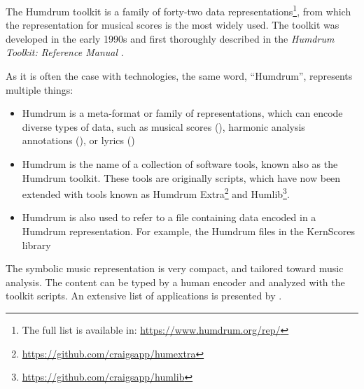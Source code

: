 


The Humdrum toolkit is a family of forty-two data representations\footnote{The full list is available in: \href{https://www.humdrum.org/rep/}{https://www.humdrum.org/rep/}}, from
which the  representation for musical scores is
the most widely used. The toolkit was developed in the early
1990s and first thoroughly described in the \emph{Humdrum
Toolkit: Reference Manual} \parencite{huron1994humdrum}.

As it is often the case with technologies, the same word,
``Humdrum'', represents multiple things:

\begin{itemize}
    \item Humdrum is a meta-format or family of
    representations, which can encode diverse types of data,
    such as musical scores (), harmonic
    analysis annotations (), or lyrics
    ()
    \item Humdrum is the name of a collection of software
    tools, known also as the Humdrum toolkit. These tools
    are originally  scripts, which have now been
    extended with  tools known as Humdrum
    Extra\footnote{\href{https://github.com/craigsapp/humextra}{https://github.com/craigsapp/humextra}}
    and
    Humlib\footnote{\href{https://github.com/craigsapp/humlib}{https://github.com/craigsapp/humlib}}.
    \item Humdrum is also used to refer to a file containing
    data encoded in a Humdrum representation. For example,
    the Humdrum files in the KernScores library
    \parencite{sapp2005online} \end{itemize}


The  symbolic music representation is very
compact, and tailored toward music analysis. The content can
be typed by a human encoder and analyzed with the toolkit
scripts. An extensive list of applications is presented by \textcite{sapp2011computational}.

